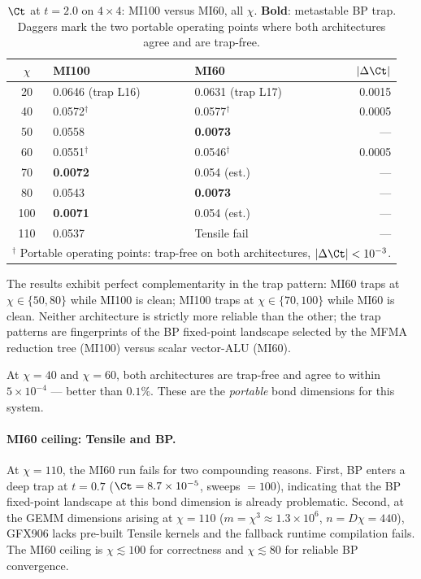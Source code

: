 \begin{table}[ht]
\centering
\caption{$\Ct$ at $t = 2.0$ on $4\times4$: MI100 versus MI60, all $\chi$.
  \textbf{Bold}: metastable BP trap.
  Daggers mark the two portable operating points where both architectures agree
  and are trap-free.}
\label{tab:mi60_chi}
\begin{tabular}{cllr}
\toprule
$\chi$ & MI100 & MI60 & $|\Delta \Ct|$ \\
\midrule
20  & 0.0646 (trap L16) & 0.0631 (trap L17) & 0.0015 \\
40  & 0.0572$^\dagger$  & 0.0577$^\dagger$   & 0.0005 \\
50  & 0.0558            & \textbf{0.0073}    & ---    \\
60  & 0.0551$^\dagger$  & 0.0546$^\dagger$   & 0.0005 \\
70  & \textbf{0.0072}   & 0.054 (est.)       & ---    \\
80  & 0.0543            & \textbf{0.0073}    & ---    \\
100 & \textbf{0.0071}   & 0.054 (est.)       & ---    \\
110 & 0.0537            & Tensile fail       & ---    \\
\midrule
\multicolumn{4}{l}{$^\dagger$ Portable operating points: trap-free on both architectures,
  $|\Delta\Ct| < 10^{-3}$.}\\
\bottomrule
\end{tabular}
\end{table}

The results exhibit perfect complementarity in the trap pattern:
MI60 traps at $\chi \in \{50, 80\}$ while MI100 is clean;
MI100 traps at $\chi \in \{70, 100\}$ while MI60 is clean.
Neither architecture is strictly more reliable than the other;
the trap patterns are fingerprints of the BP fixed-point landscape
selected by the MFMA reduction tree (MI100) versus scalar vector-ALU (MI60).

At $\chi=40$ and $\chi=60$, both architectures are trap-free and agree
to within $5\times10^{-4}$ --- better than $0.1\%$.
These are the \emph{portable} bond dimensions for this system.

\paragraph{MI60 ceiling: Tensile and BP.}
At $\chi=110$, the MI60 run fails for two compounding reasons.
First, BP enters a deep trap at $t=0.7$ ($\Ct = 8.7\times10^{-5}$,
sweeps $= 100$), indicating that the BP fixed-point landscape at this
bond dimension is already problematic.
Second, at the GEMM dimensions arising at $\chi=110$
($m = \chi^3 \approx 1.3\times10^6$, $n = D\chi = 440$),
GFX906 lacks pre-built Tensile kernels and the fallback
runtime compilation fails.
The MI60 ceiling is $\chi \lesssim 100$ for correctness and
$\chi \lesssim 80$ for reliable BP convergence.

